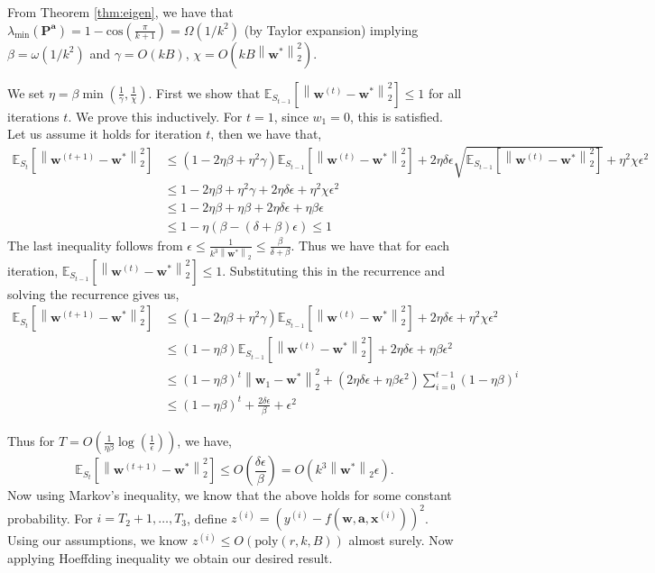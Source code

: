 \documentclass[11pt]{article}
\newcommand{\poly}{\mathrm{poly}}
\newcommand{\E}{\mathbb{E}}
\newcommand{\mat}[1]{\mathbf{#1}}
\newcommand{\vect}[1]{\mathbf{#1}}
\newcommand{\norm}[1]{\left\|#1\right\|}
\begin{document}
From Theorem \ref{thm:eigen}, we have that $\lambda_{\min}\left(\mat{P}^{\vect{a}}\right) = 1 - \text{cos}\left(\frac{\pi}{k+1}\right) = \Omega\left(1/k^2\right)$ (by Taylor expansion) implying $\beta = \omega\left(1/k^2\right)$ and $\gamma = O\left(kB\right)$, $\chi = O\left(kB\norm{\vect{w}^*}_2^2\right)$.

We set $\eta = \beta\min\left(\frac{1}{\gamma}, \frac{1}{\chi}\right)$. First we show that $\E_{S_{t-1}}[\norm{\vect{w}^{\left(t\right)} - \vect{w}^*}_2^2] \leq 1$ for all iterations $t$. We prove this inductively. For $t=1$, since $w_1 = 0$, this is satisfied. Let us assume it holds for iteration $t$, then we have that,
\begin{align*}
\E_{S_t}[\norm{\vect{w}^{\left(t+1\right)} - \vect{w}^*}_2^2] &\leq \left(1 - 2\eta \beta + \eta^2 \gamma\right)\E_{S_{t-1}}[\norm{\vect{w}^{\left(t\right)} - \vect{w}^*}_2^2] + 2\eta\delta \epsilon \sqrt{\E_{S_{t-1}}[\norm{\vect{w}^{\left(t\right)} - \vect{w}^*}_2^2]} + \eta^2 \chi \epsilon^2\\
&\leq 1 - 2\eta \beta + \eta^2 \gamma + 2\eta\delta \epsilon  + \eta^2 \chi \epsilon^2 \\
&\leq 1 - 2\eta \beta + \eta \beta + 2\eta\delta \epsilon  + \eta \beta \epsilon\\
& \leq 1 - \eta\left(\beta - \left(\delta + \beta\right)\epsilon\right) \leq 1
\end{align*}
The last inequality follows from $\epsilon \leq \frac{1}{k^3\norm{\vect{w}^*}_2} \leq \frac{\beta}{\delta + \beta}$. Thus we have that for each iteration, $\E_{S_{t-1}}[\norm{\vect{w}^{\left(t\right)} - \vect{w}^*}_2^2] \leq 1$. Substituting this in the recurrence and solving the recurrence gives us,
\begin{align*}
\E_{S_t}[\norm{\vect{w}^{\left(t+1\right)} - \vect{w}^*}_2^2] &\leq \left(1 - 2\eta \beta + \eta^2 \gamma\right)\E_{S_{t-1}}[\norm{\vect{w}^{\left(t\right)} - \vect{w}^*}_2^2] + 2\eta\delta \epsilon + \eta^2 \chi \epsilon^2\\
&\leq \left(1 - \eta \beta\right)\E_{S_{t-1}}[\norm{\vect{w}^{\left(t\right)} - \vect{w}^*}_2^2] + 2\eta\delta \epsilon + \eta \beta \epsilon^2\\
&\leq \left(1 - \eta \beta\right)^t\norm{\vect{w}_1 - \vect{w}^*}_2^2 + \left(2\eta\delta \epsilon + \eta \beta \epsilon^2\right)\sum_{i= 0}^{t-1} \left(1 - \eta \beta\right)^i\\
&\leq \left(1 - \eta \beta\right)^t + \frac{2\delta \epsilon}{\beta} + \epsilon^2
\end{align*}

Thus for $T = O\left(\frac{1}{\eta\beta}\log\left(\frac{1}{\epsilon}\right)\right)$, we have,
\[
\E_{S_t}[\norm{\vect{w}^{\left(t+1\right)} - \vect{w}^*}_2^2] \leq O\left(\frac{\delta \epsilon}{\beta}\right) = O\left(k^3 \norm{\vect{w}^*}_2 \epsilon\right).
\]
Now using Markov's inequality, we know that the above holds for some constant probability.
For $i=T_2+1,\ldots,T_3$, define $z^{\left(i\right)} = \left(y^{\left(i\right)}-f\left(\vect{w},\vect{a},\vect{x}^{\left(i\right)}\right)\right)^2$.
Using our assumptions, we know $z^{\left(i\right)} \le O\left(
\poly\left(r,k,B\right)
\right)$ almost surely.
Now applying Hoeffding inequality we obtain our desired result.
\end{document}
